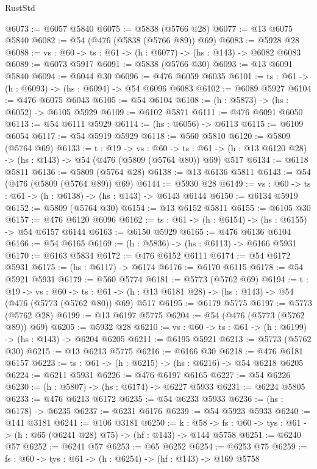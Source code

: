 \begin{lexlean}{RustStd}
\begin{coremodule}
@6073 := @6057 @5840
@6075 := @5838 (@5766 @28)
@6077 := @13 @6075 @5840
@6082 := @54 (@476 (@5838 (@5766 @89)) @69)
@6083 := @5928 @28
@6088 := {vs : @60} -> {ts : @61} -> (h : @6077) -> (hs : @143) -> @6082 @6083
@6089 := @6073 @5917
@6091 := @5838 (@5766 @30)
@6093 := @13 @6091 @5840
@6094 := @6044 @30
@6096 := @476 @6059 @6035
@6101 := {ts : @61} -> (h : @6093) -> (hs : @6094) -> @54 @6096 @6083
@6102 := @6089 @5927
@6104 := @476 @6075 @6043
@6105 := @54 @6104
@6108 := (h : @5873) -> (hs : @6052) -> @6105 @5929
@6109 := @6102 @5871
@6111 := @476 @6091 @6050
@6113 := @54 @6111 @5929
@6114 := (hs : @6056) -> @6113
@6115 := @6109 @6054
@6117 := @54 @5919 @5929
@6118 := @560 @5810
@6120 := @5809 (@5764 @69)
@6133 := {t : @19} ->
  {vs : @60} ->
  {ts : @61} -> (h : @13 @6120 @28) -> (hs : @143) -> @54 (@476 (@5809 (@5764 @80)) @69) @517
@6134 := @6118 @5811
@6136 := @5809 (@5764 @28)
@6138 := @13 @6136 @5811
@6143 := @54 (@476 (@5809 (@5764 @89)) @69)
@6144 := @5930 @28
@6149 := {vs : @60} -> {ts : @61} -> (h : @6138) -> (hs : @143) -> @6143 @6144
@6150 := @6134 @5919
@6152 := @5809 (@5764 @30)
@6154 := @13 @6152 @5811
@6155 := @6105 @30
@6157 := @476 @6120 @6096
@6162 := {ts : @61} -> (h : @6154) -> (hs : @6155) -> @54 @6157 @6144
@6163 := @6150 @5929
@6165 := @476 @6136 @6104
@6166 := @54 @6165
@6169 := (h : @5836) -> (hs : @6113) -> @6166 @5931
@6170 := @6163 @5834
@6172 := @476 @6152 @6111
@6174 := @54 @6172 @5931
@6175 := (hs : @6117) -> @6174
@6176 := @6170 @6115
@6178 := @54 @5921 @5931
@6179 := @560 @5774
@6181 := @5773 (@5762 @69)
@6194 := {t : @19} ->
  {vs : @60} ->
  {ts : @61} -> (h : @13 @6181 @28) -> (hs : @143) -> @54 (@476 (@5773 (@5762 @80)) @69) @517
@6195 := @6179 @5775
@6197 := @5773 (@5762 @28)
@6199 := @13 @6197 @5775
@6204 := @54 (@476 (@5773 (@5762 @89)) @69)
@6205 := @5932 @28
@6210 := {vs : @60} -> {ts : @61} -> (h : @6199) -> (hs : @143) -> @6204 @6205
@6211 := @6195 @5921
@6213 := @5773 (@5762 @30)
@6215 := @13 @6213 @5775
@6216 := @6166 @30
@6218 := @476 @6181 @6157
@6223 := {ts : @61} -> (h : @6215) -> (hs : @6216) -> @54 @6218 @6205
@6224 := @6211 @5931
@6226 := @476 @6197 @6165
@6227 := @54 @6226
@6230 := (h : @5807) -> (hs : @6174) -> @6227 @5933
@6231 := @6224 @5805
@6233 := @476 @6213 @6172
@6235 := @54 @6233 @5933
@6236 := (hs : @6178) -> @6235
@6237 := @6231 @6176
@6239 := @54 @5923 @5933
@6240 := @141 @3181
@6241 := @106 @3181
@6250 := {k : @58} ->
  {fs : @60} -> {tys : @61} -> (h : @65 (@6241 @28) @75) -> (hf : @143) -> @144 @5758
@6251 := @6240 @57
@6252 := @6241 @57
@6253 := @65 @6252
@6254 := @6253 @75
@6259 := {fs : @60} -> {tys : @61} -> (h : @6254) -> (hf : @143) -> @169 @5758

\end{coremodule}
\end{lexlean}
